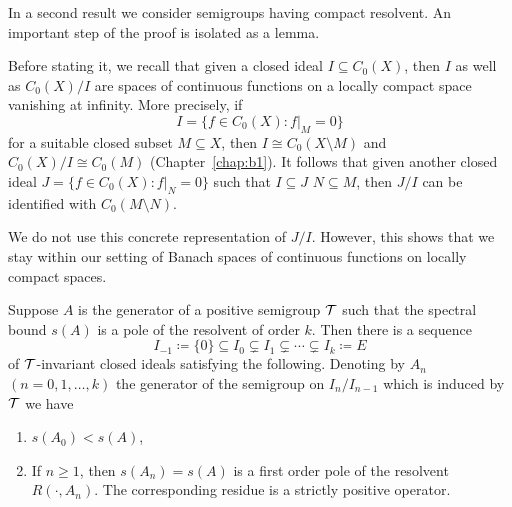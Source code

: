 In a second result we consider semigroups having compact resolvent.
An important step of the proof is isolated as a lemma.

Before stating it, we recall that given a closed ideal $I \subseteq C_{0}(X)$, then $I$ as well as $C_{0}(X)/I$ are spaces of continuous functions on a locally compact space vanishing at infinity.
More precisely, if 
\[
I = \{f \in C_{0}(X) \colon f|_{M} = 0\}
\]
for a suitable closed subset $M \subseteq X$, then $I \cong C_{0}(X\setminus M)$ and $C_{0}(X)/I \cong C_{0}(M)$ (\cf Chapter~\ref{chap:b1}).
It follows that given another closed ideal $J = \{f \in C_{0}(X) \colon f|_{N} = 0\}$ such that $I \subseteq J$ \ie $N \subseteq M$, then $J/I$ can be identified with $C_{0}(M\setminus N)$.

We do not use this concrete representation of\/ $J/I$.
However, this shows that we stay within our setting of Banach spaces of continuous functions on locally compact spaces.
\begin{lemma}\label{lem:b3-2.8}
Suppose $A$ is the generator of a positive semigroup $\mathcal{T}$ such that the spectral bound $s(A)$ is a pole of the resolvent%
of order $k$.
Then there is a sequence
\begin{equation}\label{eq:b3-2.16}
    I_{-1} \coloneq \{0\} \subseteq I_{0} \subsetneq I_{1} \subsetneq \cdots \subsetneq I_{k} \coloneq E
\end{equation}
of\/ $\mathcal{T}$-invariant closed ideals satisfying the following. 
Denoting by $A_{n}$ $(n = 0,1,\ldots,k)$ the generator of the semigroup on $I_{n}/I_{n-1}$ which is induced by $\mathcal{T}$ we have
\begin{enumerate}[\upshape (i)]
    \item 
    $s(A_{0}) < s(A)$, 
    
    \item 
    If\/ $n \geq 1$, then $s(A_{n}) = s(A)$ is a first order pole of the resolvent $R(\cdot,A_{n})$. 
    The corresponding residue is a strictly positive operator.
\end{enumerate}
\end{lemma}
